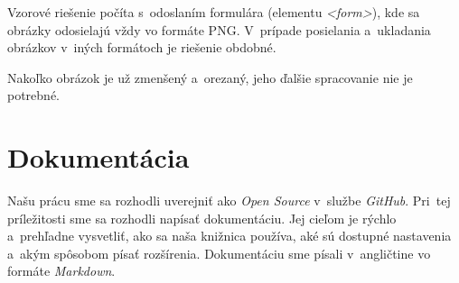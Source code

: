 Vzorové riešenie počíta s~odoslaním formulára (elementu \emph{<form>}), kde sa obrázky odosielajú vždy vo formáte PNG. V~prípade posielania a~ukladania obrázkov v~iných formátoch je riešenie obdobné.

Nakoľko obrázok je už zmenšený a~orezaný, jeho ďalšie spracovanie nie je potrebné.

\section{Dokumentácia}

Našu prácu sme sa rozhodli uverejniť ako \emph{Open Source} v~službe \emph{GitHub}. Pri~tej príležitosti sme sa rozhodli napísať dokumentáciu. Jej cieľom je rýchlo a~prehľadne vysvetliť, ako sa naša knižnica používa, aké sú dostupné nastavenia a~akým spôsobom písať rozšírenia. Dokumentáciu sme písali v~angličtine vo formáte \emph{Markdown}.